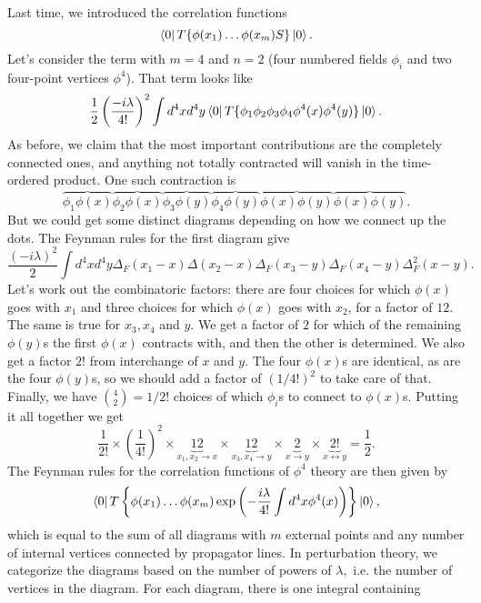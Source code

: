 
Last time, we introduced the correlation functions
$$\left< 0 \right|T\{\phi(x_1)\ldots \phi(x_m) S\}\left| 0 \right>.$$
Let's consider the term with $m=4$ and $n=2$ (four numbered fields $\phi_i$ and two four-point vertices $\phi^4$). That term looks like
$$\frac{1}{2} \left(\frac{-i\lambda}{4!}\right)^2 \int d^4x d^4 y \left< 0 \right|T\{\phi_1 \phi_2 \phi_3 \phi_4 \phi^4(x) \phi^4(y)\}\left| 0 \right>.$$
As before, we claim that the most important contributions are the completely connected ones, and anything not totally contracted will vanish in the time-ordered product. One such contraction is
$$\overbrace{\phi_1 \phi(x)}\overbrace{\phi_2 \phi(x)} \overbrace{\phi_3 \phi(y)} \overbrace{\phi_4 \phi(y)} \overbrace{\phi(x)\phi(y)}\overbrace{\phi(x)\phi(y)}.$$
But we could get some distinct diagrams depending on how we connect up the dots. The Feynman rules for the first diagram %
give
$$\frac{(-i\lambda)^2}{2}\int d^4x d^4 y \Delta_F(x_1-x)\Delta (x_2-x)\Delta_F(x_3-y) \Delta_F(x_4-y) \Delta_F^2(x-y).$$
Let's work out the combinatoric factors: there are four choices for which $\phi(x)$ goes with $x_1$ and three choices for which $\phi(x)$ goes with $x_2$, for a factor of $12$. The same is true for $x_3,x_4$ and $y$. We get a factor of $2$ for which of the remaining $\phi(y)$s the first $\phi(x)$ contracts with, and then the other is determined. We also get a factor $2!$ from interchange of $x$ and $y$. The four $\phi(x)$s are identical, as are the four $\phi(y)$s, so we should add a factor of $(1/4!)^2$ to take care of that. Finally, we have $\binom{4}{2}=1/2!$ choices of which $\phi_i$s to connect to $\phi(x)$s. Putting it all together we get
$$\frac{1}{2!}\times \left(\frac{1}{4!}\right)^2 \times \underbrace{12}_{x_1,x_2\to x} \times \underbrace{12}_{x_3,x_4\to y} \times \underbrace{2}_{x\to y} \times \underbrace{2!}_{x\leftrightarrow y} = \frac{1}{2}.$$
The Feynman rules for the correlation functions of $\phi^4$ theory are then given by
$$\left< 0 \right|T\left\{\phi(x_1)\ldots \phi(x_m)  \exp\left(-\frac{i\lambda}{4!}\int d^4x \phi^4 (x)\right)\right\}\left| 0 \right>,$$ which is equal to the sum of all diagrams with $m$ external points and any number of internal vertices connected by propagator lines. In perturbation theory, we categorize the diagrams based on the number of powers of $\lambda,$ i.e. the number of vertices in the diagram. For each diagram, there is one integral containing

